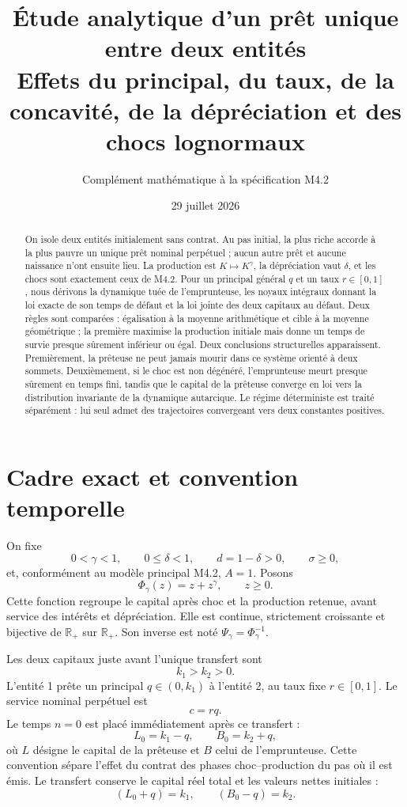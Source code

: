 \documentclass[11pt,a4paper]{article}
\title{Étude analytique d'un prêt unique entre deux entités\\
\large Effets du principal, du taux, de la concavité, de la dépréciation
et des chocs lognormaux}
\author{Complément mathématique à la spécification M4.2}
\date{29 juillet 2026}
\newcommand{\R}{\mathbb R}
\newcommand{\1}{\mathbf 1}
\theoremstyle{definition}
\theoremstyle{remark}
\begin{document}
\maketitle

\begin{abstract}
On isole deux entités initialement sans contrat. Au pas initial, la plus
riche accorde à la plus pauvre un unique prêt nominal perpétuel ; aucun
autre prêt et aucune naissance n'ont ensuite lieu. La production est
$K\mapsto K^\gamma$, la dépréciation vaut $\delta$, et les chocs sont
exactement ceux de M4.2. Pour un principal général $q$ et un taux
$r\in[0,1]$, nous dérivons la dynamique tuée de l'emprunteuse, les noyaux
intégraux donnant la loi exacte de son temps de défaut et la loi jointe des
deux capitaux au défaut. Deux règles sont comparées : égalisation à la
moyenne arithmétique et cible à la moyenne géométrique ; la première
maximise la production initiale mais donne un temps de survie presque
sûrement inférieur ou égal. Deux conclusions structurelles apparaissent.
Premièrement, la prêteuse ne peut jamais
mourir dans ce système orienté à deux sommets. Deuxièmement, si le choc est
non dégénéré, l'emprunteuse meurt presque sûrement en temps fini, tandis
que le capital de la prêteuse converge en loi vers la distribution
invariante de la dynamique autarcique. Le régime déterministe est traité
séparément : lui seul admet des trajectoires convergeant vers deux
constantes positives.
\end{abstract}

\tableofcontents

\section{Cadre exact et convention temporelle}

On fixe
\[
0<\gamma<1,\qquad 0\leq\delta<1,\qquad d=1-\delta>0,
\qquad \sigma\geq0,
\]
et, conformément au modèle principal M4.2, $A=1$. Posons
\begin{equation}
\Phi_\gamma(z)=z+z^\gamma,\qquad z\geq0.
\label{eq:phi}
\end{equation}
Cette fonction regroupe le capital après choc et la production retenue,
avant service des intérêts et dépréciation. Elle est continue, strictement
croissante et bijective de $\R_+$ sur $\R_+$. Son inverse est noté
$\Psi_\gamma=\Phi_\gamma^{-1}$.

Les deux capitaux juste avant l'unique transfert sont
\[
k_1>k_2>0.
\]
L'entité 1 prête un principal $q\in(0,k_1)$ à l'entité 2, au taux fixe
$r\in[0,1]$. Le service nominal perpétuel est
\begin{equation}
c=rq.
\label{eq:c}
\end{equation}
Le temps $n=0$ est placé immédiatement après ce transfert :
\begin{equation}
L_0=k_1-q,\qquad B_0=k_2+q,
\label{eq:initial}
\end{equation}
où $L$ désigne le capital de la prêteuse et $B$ celui de l'emprunteuse.
Cette convention sépare l'effet du contrat des phases choc--production du
pas où il est émis. Le transfert conserve le capital réel total et les
valeurs nettes initiales :
\[
(L_0+q)=k_1,\qquad (B_0-q)=k_2.
\]
\end{document}
